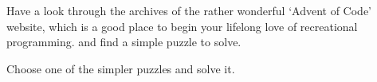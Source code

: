 Have a look through the archives of the rather wonderful `Advent of Code' website,
which is a good place to begin your lifelong love of recreational programming.
 and find a simple puzzle to solve.

\begin{exercise}
Choose one of the simpler puzzles and solve it.
\end{exercise}
